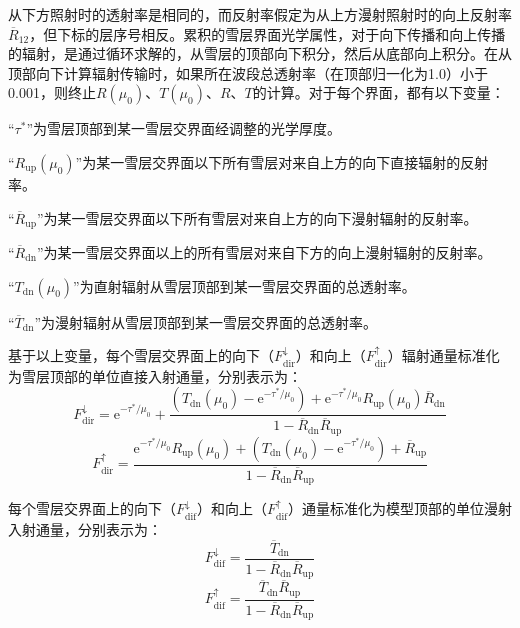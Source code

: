 从下方照射时的透射率是相同的，而反射率假定为从上方漫射照射时的向上反射率\({\overline{R}}_{12}\)，但下标的层序号相反。累积的雪层界面光学属性，对于向下传播和向上传播的辐射，是通过循环求解的，从雪层的顶部向下积分，然后从底部向上积分。在从顶部向下计算辐射传输时，如果所在波段总透射率（在顶部归一化为1.0）小于0.001，则终止\(R\left( \mu_{0} \right)\)、\(T\left( \mu_{0} \right)\)、\(R\)、\(T\)的计算。对于每个界面，都有以下变量：

``$\tau^{*}$''为雪层顶部到某一雪层交界面经调整的光学厚度。

``$R_{\mathrm{up}}\left( \mu_{0} \right)$''为某一雪层交界面以下所有雪层对来自上方的向下直接辐射的反射率。

``$\overline{R}_{\mathrm{up}}$''为某一雪层交界面以下所有雪层对来自上方的向下漫射辐射的反射率。

``$\overline{R}_{\mathrm{dn}}$''为某一雪层交界面以上的所有雪层对来自下方的向上漫射辐射的反射率。

``$T_{\mathrm{dn}}\left( \mu_{0} \right)$''为直射辐射从雪层顶部到某一雪层交界面的总透射率。

``$\overline{T}_{\mathrm{dn}}$''为漫射辐射从雪层顶部到某一雪层交界面的总透射率。

基于以上变量，每个雪层交界面上的向下（\(F_{\mathrm{dir}}^{\downarrow}\)）和向上（\(F_{\mathrm{dir}}^{\uparrow}\)）辐射通量标准化为雪层顶部的单位直接入射通量，分别表示为：
\begin{equation}
  F_{\mathrm{dir}}^{\downarrow} = {\mathrm e}^{- \tau^{*}/\mu_{0}} + \frac{\left( T_{\mathrm{dn}}\left( \mu_{0} \right) - {\mathrm e}^{- \tau^{*}/\mu_{0}} \right) + {\mathrm e}^{- \tau^{*}/\mu_{0}}R_{\mathrm{up}}\left( \mu_{0} \right){\overline{R}}_{\mathrm{dn}}}{1 - {\overline{R}}_{\mathrm{dn}}{\overline{R}}_{\mathrm{up}}}
\end{equation}
\begin{equation}
  F_{\mathrm{dir}}^{\uparrow} = \frac{{\mathrm e}^{- \tau^{*}/\mu_{0}}R_{\mathrm{up}}\left( \mu_{0} \right) + \left( T_{\mathrm{dn}}\left( \mu_{0} \right) - {\mathrm e}^{- \tau^{*}/\mu_{0}} \right) + {\overline{R}}_{\mathrm{up}}}{1 - {\overline{R}}_{\mathrm{dn}}{\overline{R}}_{\mathrm{up}}}
\end{equation}

每个雪层交界面上的向下（\(F_{\mathrm{dif}}^{\downarrow}\)）和向上（\(F_{\mathrm{dif}}^{\uparrow}\)）通量标准化为模型顶部的单位漫射入射通量，分别表示为：
\begin{equation}
  F_{\mathrm{dif}}^{\downarrow} = \frac{{\overline{T}}_{\mathrm{dn}}}{1 - {\overline{R}}_{\mathrm{dn}}{\overline{R}}_{\mathrm{up}}}
\end{equation}
\begin{equation}
  F_{\mathrm{dif}}^{\uparrow} = \frac{{\overline{T}}_{\mathrm{dn}}{\overline{R}}_{\mathrm{up}}}{1 - {\overline{R}}_{\mathrm{dn}}{\overline{R}}_{\mathrm{up}}}
\end{equation}

